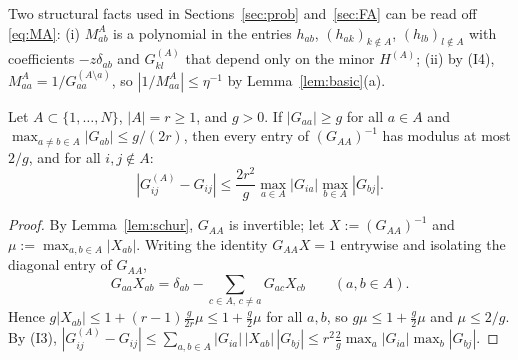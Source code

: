 \begin{remark}\label{rem:rows}
Two structural facts used in Sections~\ref{sec:prob} and~\ref{sec:FA} can be read off \eqref{eq:MA}: (i) $M^A_{ab}$ is a polynomial in the entries $h_{ab}$, $(h_{ak})_{k\notin A}$, $(h_{lb})_{l\notin A}$ with coefficients $-z\delta_{ab}$ and $G^{(A)}_{kl}$
that depend only on the minor $H^{(A)}$; (ii) by (I4), $M^A_{aa}=1/G^{(A\setminus a)}_{aa}$, so $|1/M^A_{aa}|\le\eta^{-1}$ by Lemma~\ref{lem:basic}(a).
\end{remark}

\begin{lemma}\label{lem:minor}
Let $A\subset\{1,\dots,N\}$, $|A|=r\ge1$, and $g>0$. If $|G_{aa}|\ge g$ for all $a\in A$ and $\max_{a\ne b\in A}|G_{ab}|\le g/(2r)$, then every entry of $(G_{AA})^{-1}$ has modulus at most $2/g$, and for all $i,j\notin A$:
\[
 |G^{(A)}_{ij}-G_{ij}|\le\frac{2r^2}g\max_{a\in A}|G_{ia}|\max_{b\in A}|G_{bj}|.
\]
\end{lemma}
\begin{proof}
By Lemma~\ref{lem:schur}, $G_{AA}$ is invertible; let $X:=(G_{AA})^{-1}$ and $\mu:=\max_{a,b\in A}|X_{ab}|$. Writing the identity $G_{AA}X=1$ entrywise and isolating the diagonal entry of $G_{AA}$,
\[
 G_{aa}X_{ab}=\delta_{ab}-\sum_{c\in A,\,c\ne a}G_{ac}X_{cb}\qquad(a,b\in A).
\]
Hence $g|X_{ab}|\le1+(r-1)\frac{g}{2r}\mu\le1+\frac g2\mu$ for all $a,b$, so $g\mu\le1+\frac g2\mu$ and $\mu\le2/g$.
By (I3), $|G^{(A)}_{ij}-G_{ij}|\le\sum_{a,b\in A}|G_{ia}|\,|X_{ab}|\,|G_{bj}|\le r^2\frac2g\max_a|G_{ia}|\max_b|G_{bj}|$.
\end{proof}

